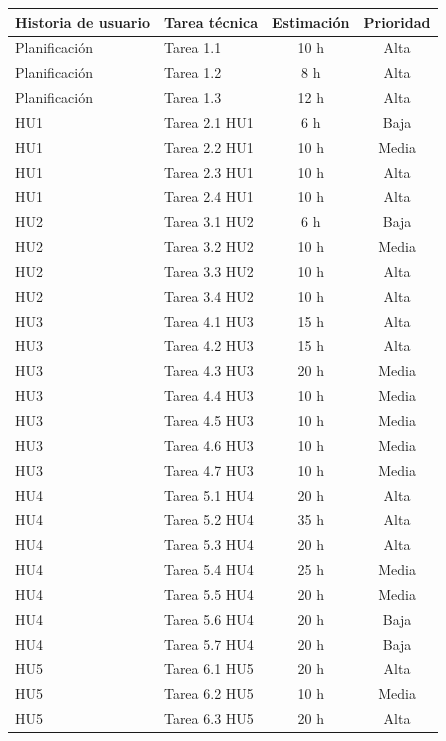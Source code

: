 \documentclass[
11pt, %
]{charter}
\begin{document}
\begin{table}[htpb]
\centering
\begin{tabularx}{\linewidth}{@{}|X|X|c|c|@{}}
\hline
\rowcolor[HTML]{C0C0C0}
Historia de usuario & Tarea técnica & Estimación & Prioridad \\ \hline
Planificación & Tarea 1.1 & 10 h & Alta \\ \hline
Planificación & Tarea 1.2 & 8 h & Alta \\ \hline
Planificación & Tarea 1.3 & 12 h & Alta \\ \hline
HU1 & Tarea 2.1 HU1 & 6 h & Baja \\ \hline
HU1 & Tarea 2.2 HU1 & 10 h & Media \\ \hline
HU1 & Tarea 2.3 HU1 & 10 h & Alta \\ \hline
HU1 & Tarea 2.4 HU1 & 10 h & Alta \\ \hline

HU2 & Tarea 3.1 HU2 & 6 h & Baja \\ \hline
HU2 & Tarea 3.2 HU2 & 10 h & Media \\ \hline
HU2 & Tarea 3.3 HU2 & 10 h & Alta \\ \hline
HU2 & Tarea 3.4 HU2 & 10 h & Alta \\ \hline

HU3 & Tarea 4.1 HU3 & 15 h & Alta \\ \hline
HU3 & Tarea 4.2 HU3 & 15 h & Alta \\ \hline
HU3 & Tarea 4.3 HU3 & 20 h & Media \\ \hline
HU3 & Tarea 4.4 HU3 & 10 h & Media \\ \hline
HU3 & Tarea 4.5 HU3 & 10 h & Media \\ \hline
HU3 & Tarea 4.6 HU3 & 10 h & Media \\ \hline
HU3 & Tarea 4.7 HU3 & 10 h & Media \\ \hline

HU4 & Tarea 5.1 HU4 & 20 h & Alta \\ \hline
HU4 & Tarea 5.2 HU4 & 35 h & Alta \\ \hline
HU4 & Tarea 5.3 HU4 & 20 h & Alta \\ \hline
HU4 & Tarea 5.4 HU4 & 25 h & Media \\ \hline
HU4 & Tarea 5.5 HU4 & 20 h & Media \\ \hline
HU4 & Tarea 5.6 HU4 & 20 h & Baja \\ \hline
HU4 & Tarea 5.7 HU4 & 20 h & Baja \\ \hline

HU5 & Tarea 6.1 HU5 & 20 h & Alta \\ \hline
HU5 & Tarea 6.2 HU5 & 10 h & Media \\ \hline
HU5 & Tarea 6.3 HU5 & 20 h & Alta \\ \hline


\end{tabularx}
\end{table}
\end{document}
